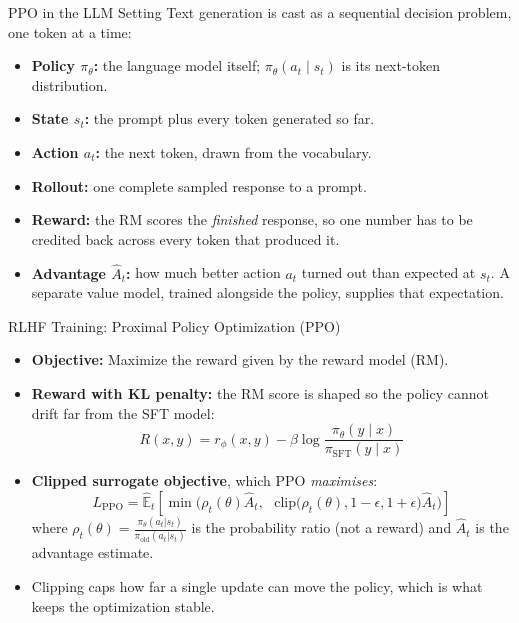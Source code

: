 \begin{frame}[t]{PPO in the LLM Setting}
  Text generation is cast as a sequential decision problem, one token at a time:
  \begin{itemize}\itemsep0.3em
    \item[\textcolor{red}{$\blacktriangleright$}] \textbf{Policy $\pi_\theta$:} the language model itself; $\pi_\theta(a_t \mid s_t)$ is its next-token distribution.
    \item[\textcolor{red}{$\blacktriangleright$}] \textbf{State $s_t$:} the prompt plus every token generated so far.
    \item[\textcolor{red}{$\blacktriangleright$}] \textbf{Action $a_t$:} the next token, drawn from the vocabulary.
    \item[\textcolor{red}{$\blacktriangleright$}] \textbf{Rollout:} one complete sampled response to a prompt.
    \item[\textcolor{red}{$\blacktriangleright$}] \textbf{Reward:} the RM scores the \emph{finished} response, so one number has to be credited back across every token that produced it.
    \item[\textcolor{red}{$\blacktriangleright$}] \textbf{Advantage $\hat{A}_t$:} how much better action $a_t$ turned out than expected at $s_t$. A separate value model, trained alongside the policy, supplies that expectation.
  \end{itemize}
\end{frame}

\begin{frame}[t]{RLHF Training: Proximal Policy Optimization (PPO)}
  \begin{itemize}
    \item[\textcolor{red}{$\blacktriangleright$}] \textbf{Objective:} Maximize the reward given by the reward model (RM).
    \item[\textcolor{red}{$\blacktriangleright$}] \textbf{Reward with KL penalty:} the RM score is shaped so the policy cannot drift far from the SFT model:
      \[
        R(x,y) = r_\phi(x,y) - \beta \log \frac{\pi_\theta(y \mid x)}{\pi_{\text{SFT}}(y \mid x)}
      \]
    \item[\textcolor{red}{$\blacktriangleright$}] \textbf{Clipped surrogate objective}, which PPO \emph{maximises}:
      \[
        L_{\mathrm{PPO}} = \hat{\mathbb{E}}_t\left[
            \min\Big(\rho_t(\theta)\hat{A}_t,\,\,\,\, \text{clip}\big(\rho_t(\theta), 1 - \epsilon, 1 + \epsilon\big)\hat{A}_t\Big)
          \right]
      \]
      where $\rho_t(\theta) = \frac{\pi_\theta(a_t|s_t)}{\pi_\text{old}(a_t|s_t)}$ is the probability ratio (not a reward) and $\hat{A}_t$ is the advantage estimate.
    \item[\textcolor{red}{$\blacktriangleright$}] Clipping caps how far a single update can move the policy, which is what keeps the optimization stable.
  \end{itemize}
\end{frame}

